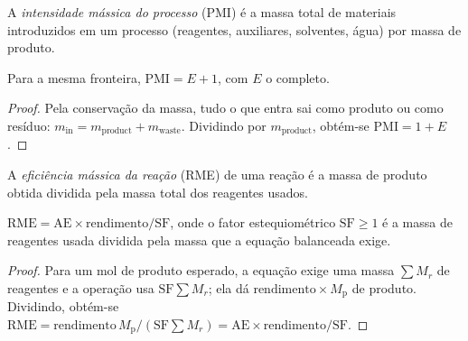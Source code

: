 \begin{definition}\label{def:b3:green-industrial:pmi}
A \emph{intensidade mássica do processo} (PMI) é a
massa total de materiais introduzidos em um processo (reagentes, auxiliares, solventes,
água) por massa de produto.
\end{definition}

\begin{proposition}\label{prop:b3:green-industrial:pmi-e}
Para a mesma fronteira, $\mathrm{PMI} = E + 1$, com $E$ o  completo.
\end{proposition}

\begin{proof}
Pela conservação da massa, tudo o que entra sai como produto ou como resíduo:
$m_{\mathrm{in}} = m_{\mathrm{product}} + m_{\mathrm{waste}}$. Dividindo por $m_{\mathrm{product}}$, obtém-se $\mathrm{PMI} = 1 + E$.
\end{proof}

\begin{definition}\label{def:b3:green-industrial:rme}
A \emph{eficiência mássica da reação} (RME) de uma
reação é a massa de produto obtida dividida pela massa total dos
reagentes usados.
\end{definition}

\begin{proposition}\label{prop:b3:green-industrial:rme}
$\mathrm{RME} = \mathrm{AE} \times \text{rendimento}/\mathrm{SF}$, onde o fator estequiométrico $\mathrm{SF} \ge 1$ é a massa de
reagentes usada dividida pela massa que a equação balanceada exige.
\end{proposition}

\begin{proof}
Para um mol de produto esperado, a equação exige uma massa $\sum M_r$ de reagentes e
a operação usa $\mathrm{SF}\sum M_r$; ela dá $\text{rendimento} \times M_{\mathrm p}$ de produto. Dividindo, obtém-se
$\mathrm{RME} = \text{rendimento}\,M_{\mathrm p}/(\mathrm{SF}\sum M_r) = \mathrm{AE} \times \text{rendimento}/\mathrm{SF}$.
\end{proof}


